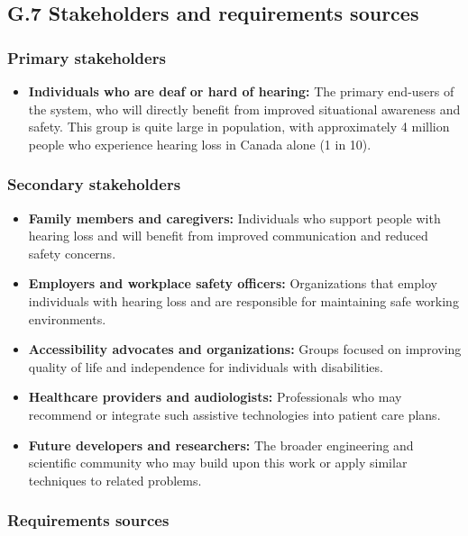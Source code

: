 \documentclass[12pt]{article}
\theoremstyle{definition}
\begin{document}
\subsection{G.7 Stakeholders and requirements sources}

\subsubsection{Primary stakeholders}

\begin{itemize}
\item \textbf{Individuals who are deaf or hard of hearing:} The primary
end-users of the system, who will directly benefit from improved
situational awareness and safety. This group is quite large in population,
with approximately 4 million people who experience hearing loss 
in Canada alone (1 in 10).
\end{itemize}

\subsubsection{Secondary stakeholders}

\begin{itemize}
\item \textbf{Family members and caregivers:} Individuals who support people
with hearing loss and will benefit from improved communication and reduced
safety concerns.

\item \textbf{Employers and workplace safety officers:} Organizations that
employ individuals with hearing loss and are responsible for maintaining
safe working environments.

\item \textbf{Accessibility advocates and organizations:} Groups focused on
improving quality of life and independence for individuals with disabilities.

\item \textbf{Healthcare providers and audiologists:} Professionals who may
recommend or integrate such assistive technologies into patient care plans.

\item \textbf{Future developers and researchers:} The broader engineering
and scientific community who may build upon this work or apply similar
techniques to related problems.
\end{itemize}

\subsubsection{Requirements sources}
\end{document}

